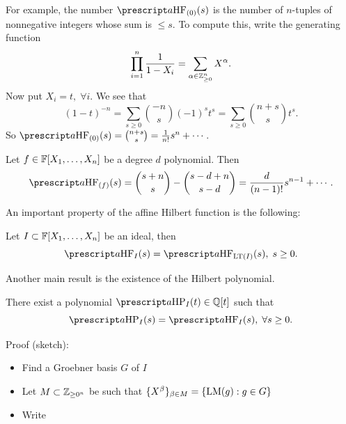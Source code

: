 \begin{itemize}
    \begin{example}
        For example, the number $\upleft{a}\text{HF}_{(0)}(s)$ is the number of $n$-tuples of 
        nonnegative integers whose sum is $\leq s$. To compute this, write the generating function
        \begin{equation}
            \prod_{i=1}^n\frac{1}{1-X_i} = \sum_{\alpha\in\mathbb{Z}_{\geq0}^n}X^\alpha.
        \end{equation}
        Now put $X_i = t,\;\forall i$. We see that 
        \begin{equation}
            (1-t)^{-n} = \sum_{s\geq0}\binom{-n}{s}(-1)^st^s = \sum_{s\geq0}\binom{n+s}{s}t^s.
        \end{equation}
        So $\upleft{a}\text{HF}_{(0)}(s)=\binom{n+s}{s}=\frac{1}{n!}s^n + \cdots$.
    \end{example}
    \begin{example}
        Let $f\in\mathbb{F}[X_1,\dots, X_n]$ be a degree $d$ polynomial. Then 
        \begin{equation}
            \upleft{a}\text{HF}_{(f)}(s) = \binom{s+n}{s} - \binom{s-d+n}{s-d} = \frac{d}{(n-1)!}s^{n-1}+\cdots.
        \end{equation} 
    \end{example}
    An important property of the affine Hilbert function is the following:
\begin{theorem}
    Let $I\subset \mathbb{F}[X_1,\dots, X_n]$ be an ideal, then 
    \begin{equation}
        \upleft{a}\text{HF}_I(s)  = \upleft{a}\text{HF}_{\LT(I)}(s),\;s\geq0.
    \end{equation}
\end{theorem}
Another main result is the existence of the Hilbert polynomial.
\begin{theorem}
    There exist a polynomial $\upleft{a}\text{HP}_I(t)\in\bbQ[t]$ such that 
    \begin{equation}
        \upleft{a}\text{HP}_I(s) =   \upleft{a}\text{HF}_I(s),\;\forall s\geq0.
    \end{equation}
\end{theorem}
Proof (sketch):
\begin{itemize}
    \item Find a Groebner basis $G$ of $I$
    \item Let $M\subset \mathbb{Z}_{\geq0^n}$ be such that $\{X^\beta\}_{\beta\in M} = \{\text{LM}(g):g\in G\}$
    \item Write 
    \begin{equation}

\end{equation}
\end{itemize}
\end{itemize}
